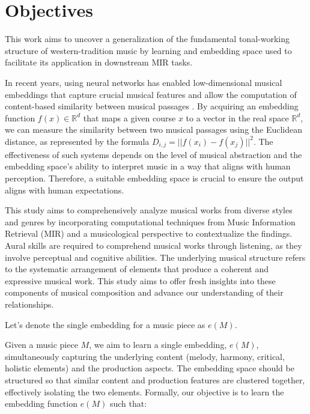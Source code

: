 \section{Objectives}

This work aims to uncover a generalization of the fundamental tonal-working structure of western-tradition music by learning and embedding space used to facilitate its application in downstream MIR tasks.

In recent years, using neural networks has enabled low-dimensional musical embeddings that capture crucial musical features and allow the computation of content-based similarity between musical passages \cite{Chen2020LearningRecommendation}\cite{KimLEARNINGLOSS}\cite{Hung2022Feature-informedClassification}\cite{WonEmotionStories}. By acquiring an embedding function $f(x) \in \mathbb{R}^d$ that maps a given course $x$ to a vector in the real space $\mathbb{R}^d$, we can measure the similarity between two musical passages using the Euclidean distance, as represented by the formula $D_{i,j} = ||f(x_i) - f(x_j)||^2$. The effectiveness of such systems depends on the level of musical abstraction and the embedding space's ability to interpret music in a way that aligns with human perception. Therefore, a suitable embedding space is crucial to ensure the output aligns with human expectations.

This study aims to comprehensively analyze musical works from diverse styles and genres by incorporating computational techniques from Music Information Retrieval (MIR) and a musicological perspective to contextualize the findings. Aural skills are required to comprehend musical works through listening, as they involve perceptual and cognitive abilities. The underlying musical structure refers to the systematic arrangement of elements that produce a coherent and expressive musical work. This study aims to offer fresh insights into these components of musical composition and advance our understanding of their relationships.

Let's denote the single embedding for a music piece as $e(M)$.

Given a music piece $M$, we aim to learn a single embedding, $e(M)$, simultaneously capturing the underlying content (melody, harmony, critical, holistic elements) and the production aspects. The embedding space should be structured so that similar content and production features are clustered together, effectively isolating the two elements. Formally, our objective is to learn the embedding function $e(M)$ such that:

